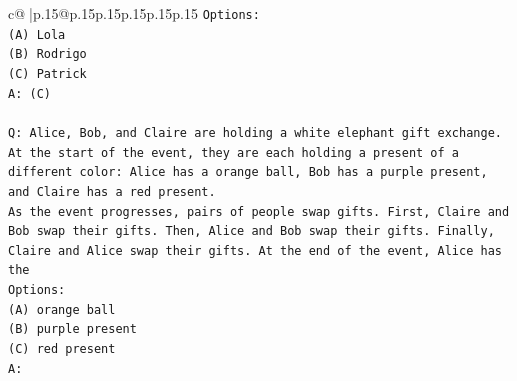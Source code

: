 \documentclass{article}
\begin{document}
{\begin{supertabular}{c@{$\;$}|p{.15\linewidth}@{}p{.15\linewidth}p{.15\linewidth}p{.15\linewidth}p{.15\linewidth}p{.15\linewidth}}
{{{\texttt{Options:} \\
\texttt{(A) Lola} \\
\texttt{(B) Rodrigo} \\
\texttt{(C) Patrick} \\
\texttt{A: (C)} \\
\\ 
\texttt{Q: Alice, Bob, and Claire are holding a white elephant gift exchange. At the start of the event, they are each holding a present of a different color: Alice has a orange ball, Bob has a purple present, and Claire has a red present.} \\
\texttt{As the event progresses, pairs of people swap gifts. First, Claire and Bob swap their gifts. Then, Alice and Bob swap their gifts. Finally, Claire and Alice swap their gifts. At the end of the event, Alice has the} \\
\texttt{Options:} \\
\texttt{(A) orange ball} \\
\texttt{(B) purple present} \\
\texttt{(C) red present} \\
\texttt{A:} \\
            }
        }
    }
     \\ \\


\end{supertabular}}
\end{document}
